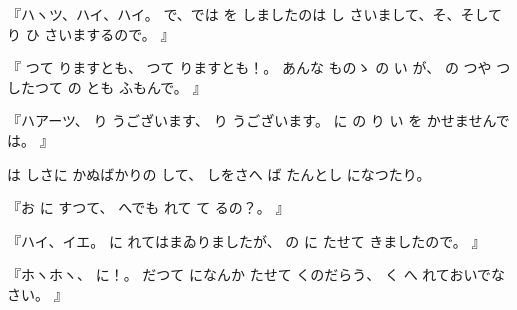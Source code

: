 『ハヽツ、ハイ、ハイ。
で、では
を
しましたのは
し
さいまして、そ、そして
り
ひ
さいまするので。
』

『
つて
りますとも、
つて
りますとも！。
あんな
ものゝ
の
い
が、
の
つや
つ
したつて
の
とも
ふもんで。
』

『ハアーツ、
り
うございます、
り
うございます。
に
の
り
い
を
かせませんでは。
』

は
しさに
かぬばかりの
して、
しをさへ
ば
たんとし
になつたり。

『お
に
すつて、
へでも
れて
て
るの？。
』

『ハイ、イエ。
に
れてはまゐりましたが、
の
に
たせて
きましたので。
』

『ホヽホヽ、
に！。
だつて
になんか
たせて
くのだらう、
く
へ
れておいでなさい。
』

